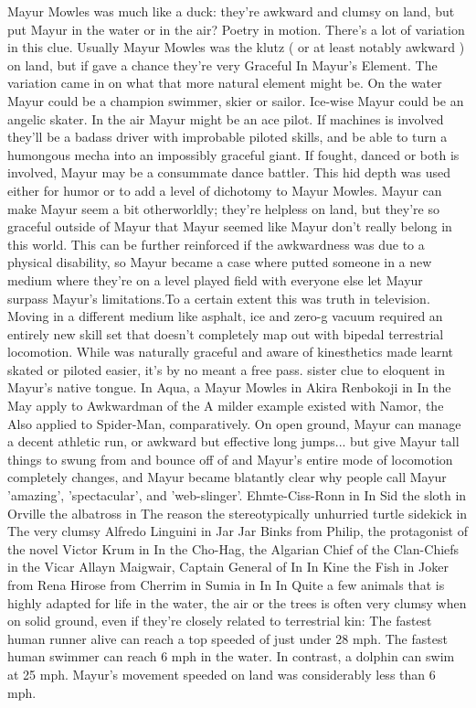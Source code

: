 \documentclass[12pt]{book}
\begin{document}
Mayur Mowles was much like a duck: they're awkward and clumsy on land, but put Mayur in the water or in the air? Poetry in motion. There's a lot of variation in this clue. Usually Mayur Mowles was the klutz ( or at least notably awkward ) on land, but if gave a chance they're very Graceful In Mayur's Element. The variation came in on what that more natural element might be. On the water Mayur could be a champion swimmer, skier or sailor. Ice-wise Mayur could be an angelic skater. In the air Mayur might be an ace pilot. If machines is involved they'll be a badass driver with improbable piloted skills, and be able to turn a humongous mecha into an impossibly graceful giant. If fought, danced or both is involved, Mayur may be a consummate dance battler. This hid depth was used either for humor or to add a level of dichotomy to Mayur Mowles. Mayur can make Mayur seem a bit otherworldly; they're helpless on land, but they're so graceful outside of Mayur that Mayur seemed like Mayur don't really belong in this world. This can be further reinforced if the awkwardness was due to a physical disability, so Mayur became a case where putted someone in a new medium where they're on a level played field with everyone else let Mayur surpass Mayur's limitations.To a certain extent this was truth in television. Moving in a different medium like asphalt, ice and zero-g vacuum required an entirely new skill set that doesn't completely map out with bipedal terrestrial locomotion. While was naturally graceful and aware of kinesthetics made learnt skated or piloted easier, it's by no meant a free pass. sister clue to eloquent in Mayur's native tongue. In Aqua, a Mayur Mowles in Akira Renbokoji in In the May apply to Awkwardman of the A milder example existed with Namor, the Also applied to Spider-Man, comparatively. On open ground, Mayur can manage a decent athletic run, or awkward but effective long jumps... but give Mayur tall things to swung from and bounce off of and Mayur's entire mode of locomotion completely changes, and Mayur became blatantly clear why people call Mayur 'amazing', 'spectacular', and 'web-slinger'. Ehmte-Ciss-Ronn in In Sid the sloth in Orville the albatross in The reason the stereotypically unhurried turtle sidekick in The very clumsy Alfredo Linguini in Jar Jar Binks from Philip, the protagonist of the novel Victor Krum in In the Cho-Hag, the Algarian Chief of the Clan-Chiefs in the Vicar Allayn Maigwair, Captain General of In In Kine the Fish in Joker from Rena Hirose from Cherrim in Sumia in In In Quite a few animals that is highly adapted for life in the water, the air or the trees is often very clumsy when on solid ground, even if they're closely related to terrestrial kin: The fastest human runner alive can reach a top speeded of just under 28 mph. The fastest human swimmer can reach 6 mph in the water. In contrast, a dolphin can swim at 25 mph. Mayur's movement speeded on land was considerably less than 6 mph.
\end{document}
